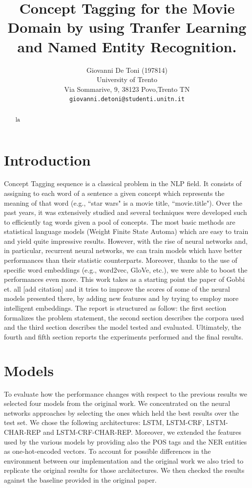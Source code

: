 \documentclass[11pt,a4paper]{article}
\title{Concept Tagging for the Movie Domain by using Tranfer Learning and Named Entity Recognition.}
\author{Giovanni De Toni (197814) \\
  University of Trento \\ Via Sommarive, 9, 38123 Povo,Trento TN\\
  \texttt{giovanni.detoni@studenti.unitn.it}}
\date{}
\begin{document}
\maketitle

\begin{abstract}
la
\end{abstract}

\section{Introduction}
Concept Tagging sequence is a classical problem in the NLP field. It consists of assigning to each word of a sentence a given concept which represents the meaning of that word (e.g., ``star wars" is a movie title, ``movie.title"). Over the past years, it was extensively studied and several techniques were developed such to efficiently tag words given a pool of concepts. The most basic methods are statistical language models (Weight Finite State Automa) which are easy to train and yield quite impressive results. However, with the rise of neural networks and, in particular, recurrent neural networks, we can train models which have better performances than their statistic counterparts. Moreover, thanks to the use of specific word embeddings (e.g., word2vec, GloVe, etc.), we were able to boost the performances even more.
This work takes as a starting point the paper of Gobbi et. all [add citation] and it tries to improve the scores of some of the neural models presented there, by adding new features and by trying to employ more intelligent embeddings. The report is structured as follow: the first section formalizes the problem statement, the second section describes the corpora used and the third section describes the model tested and evaluated. Ultimately,  the fourth and fifth section reports the experiments performed and the final results.  	

\section{Models}

To evaluate how the performance changes with respect to the previous results we selected four models from the original work. We concentrated on the neural networks approaches by selecting the ones which held the best results over the test set. We chose the following architectures: LSTM, LSTM-CRF, LSTM-CHAR-REP and LSTM-CRF-CHAR-REP. 
Moreover, we extended the features used by the various models by providing also the POS tags and the NER entities as one-hot-encoded vectors. 
To account for possible differences in the environment between our implementation and the original work we also tried to replicate the original results for those architectures. We then checked the results against the baseline provided in the original paper.
\end{document}
